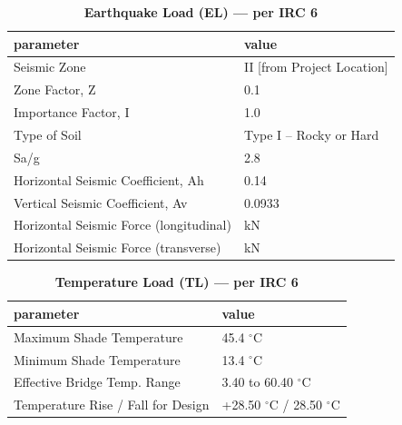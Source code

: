 \documentclass[12pt,a4paper]{report}
\numberwithin{table}{chapter}
\numberwithin{figure}{chapter}
\begin{document}
\vspace{1em}
\begin{longtable}{|L{5.5cm}|p{10.0cm}|}
\caption{\textbf{Earthquake Load (EL) --- per IRC 6}}
\hline
\textbf{parameter} & \textbf{value} \\
\hline
\textnormal{Seismic Zone} & II [from Project Location] \\[6pt]
\hline
\textnormal{Zone Factor, Z} & 0.1 \\[6pt]
\hline
\textnormal{Importance Factor, I} & 1.0 \\[6pt]
\hline
\textnormal{Type of Soil} & Type I – Rocky or Hard \\[6pt]
\hline
\textnormal{Sa/g} & 2.8 \\[6pt]
\hline
\textnormal{Horizontal Seismic Coefficient, Ah} & 0.14 \\[6pt]
\hline
\textnormal{Vertical Seismic Coefficient, Av} & 0.0933 \\[6pt]
\hline
\textnormal{Horizontal Seismic Force (longitudinal)} &  kN \\[6pt]
\hline
\textnormal{Horizontal Seismic Force (transverse)} &  kN \\[6pt]
\hline
\end{longtable}

\vspace{1em}
\begin{longtable}{|L{5.5cm}|p{10.0cm}|}
\caption{\textbf{Temperature Load (TL) --- per IRC 6}}
\hline
\textbf{parameter} & \textbf{value} \\
\hline
\textnormal{Maximum Shade Temperature} & 45.4 $^\circ$C \\[6pt]
\hline
\textnormal{Minimum Shade Temperature} & 13.4 $^\circ$C \\[6pt]
\hline
\textnormal{Effective Bridge Temp. Range} & 3.40 to 60.40 $^\circ$C \\[6pt]
\hline
\textnormal{Temperature Rise / Fall for Design} & +28.50 $^\circ$C / \textminus{}28.50 $^\circ$C \\[6pt]
\hline
\end{longtable}
\end{document}
